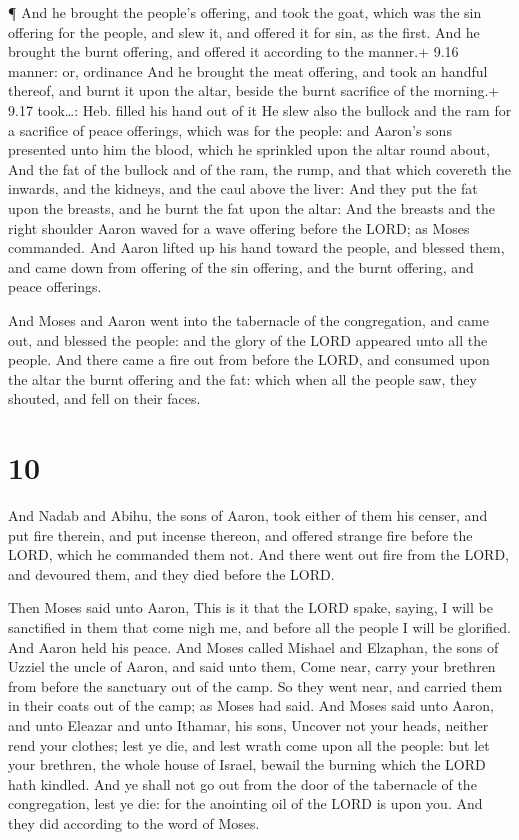  ¶ And he brought the people's offering, and took the goat,
which was the sin offering for the people, and slew it, and offered it
for sin, as the first.  And he brought the burnt offering,
and offered it according to the manner.+ 9.16 manner: or, ordinance
 And he brought the meat offering, and took an handful
thereof, and burnt it upon the altar, beside the burnt sacrifice of the
morning.+ 9.17 took\ldots: Heb. filled his hand out of it 
He slew also the bullock and the ram for a sacrifice of peace offerings,
which was for the people: and Aaron's sons presented unto him the blood,
which he sprinkled upon the altar round about,  And the fat
of the bullock and of the ram, the rump, and that which covereth the
inwards, and the kidneys, and the caul above the liver: 
And they put the fat upon the breasts, and he burnt the fat upon the
altar:  And the breasts and the right shoulder Aaron waved
for a wave offering before the LORD; as Moses commanded. 
And Aaron lifted up his hand toward the people, and blessed them, and
came down from offering of the sin offering, and the burnt offering, and
peace offerings.

 And Moses and Aaron went into the tabernacle of the
congregation, and came out, and blessed the people: and the glory of the
LORD appeared unto all the people.  And there came a fire
out from before the LORD, and consumed upon the altar the burnt offering
and the fat: which when all the people saw, they shouted, and fell on
their faces.

\hypertarget{section-9}{%
\section{10}\label{section-9}}

 And Nadab and Abihu, the sons of Aaron, took either of them
his censer, and put fire therein, and put incense thereon, and offered
strange fire before the LORD, which he commanded them not. 
And there went out fire from the LORD, and devoured them, and they died
before the LORD.

 Then Moses said unto Aaron, This is it that the LORD spake,
saying, I will be sanctified in them that come nigh me, and before all
the people I will be glorified. And Aaron held his peace. 
And Moses called Mishael and Elzaphan, the sons of Uzziel the uncle of
Aaron, and said unto them, Come near, carry your brethren from before
the sanctuary out of the camp.  So they went near, and
carried them in their coats out of the camp; as Moses had said.
 And Moses said unto Aaron, and unto Eleazar and unto
Ithamar, his sons, Uncover not your heads, neither rend your clothes;
lest ye die, and lest wrath come upon all the people: but let your
brethren, the whole house of Israel, bewail the burning which the LORD
hath kindled.  And ye shall not go out from the door of the
tabernacle of the congregation, lest ye die: for the anointing oil of
the LORD is upon you. And they did according to the word of Moses.

